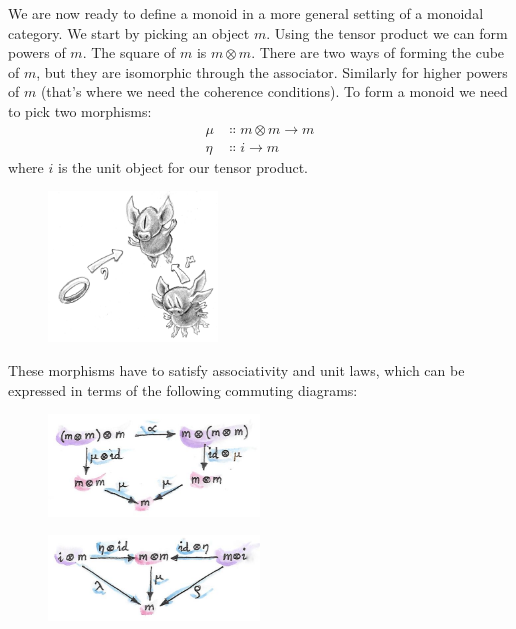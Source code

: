 We are now ready to define a monoid in a more general setting of a
monoidal category. We start by picking an object $m$. Using the
tensor product we can form powers of $m$. The square of
$m$ is $m \otimes m$. There are two ways of forming the cube
of $m$, but they are isomorphic through the associator. Similarly
for higher powers of $m$ (that's where we need the coherence
conditions). To form a monoid we need to pick two morphisms:
\begin{align*}
\mu &\Colon m \otimes m \to m \\
\eta &\Colon i \to m
\end{align*}
where $i$ is the unit object for our tensor product.

\begin{figure}[H]
\centering
\includegraphics[width=0.4\textwidth]{images/monoid-1.jpg}
\end{figure}

\noindent
These morphisms have to satisfy associativity and unit laws, which can
be expressed in terms of the following commuting diagrams:

\begin{figure}[H]
\centering
\includegraphics[width=0.5\textwidth]{images/assoctensor.jpg}
\end{figure}

\begin{figure}[H]
\centering
\includegraphics[width=0.5\textwidth]{images/unitmon.jpg}
\end{figure}

